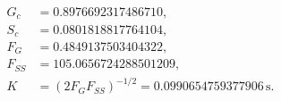 \begin{align}
G_c&=0.8976692317486710,\\
S_c&=0.0801818817764104,\\
F_G&=0.4849137503404322,\\
F_{SS}&=105.0656724288501209,\\
K&=(2F_GF_{SS})^{-1/2}=0.0990654759377906\,\mathrm{s}.
\end{align}
